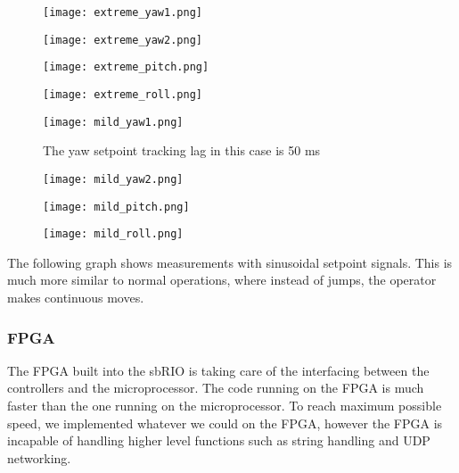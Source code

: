 \begin{figure}[h] \label{ fig7} \begin{minipage}[b]{0.50\linewidth}\centering\texttt{[image: extreme\_yaw1.png]} \caption{} \end{minipage} \begin{minipage}[b]{0.50\linewidth}\centering\texttt{[image: extreme\_yaw2.png]} \caption{} \end{minipage} \begin{minipage}[b]{0.50\linewidth}\centering\texttt{[image: extreme\_pitch.png]} \caption{} \end{minipage}\hfill \begin{minipage}[b]{0.50\linewidth}\centering\texttt{[image: extreme\_roll.png]} \caption{} \end{minipage} \end{figure}

\begin{figure}[h] \label{ fig7} \begin{minipage}[b]{0.50\linewidth}\centering\texttt{[image: mild\_yaw1.png]} \caption{The yaw setpoint tracking lag in this case is 50 ms} \end{minipage} \begin{minipage}[b]{0.50\linewidth}\centering\texttt{[image: mild\_yaw2.png]} \caption{} \end{minipage} \begin{minipage}[b]{0.50\linewidth}\centering\texttt{[image: mild\_pitch.png]} \caption{} \end{minipage}\hfill \begin{minipage}[b]{0.50\linewidth}\centering\texttt{[image: mild\_roll.png]} \caption{} \end{minipage} \end{figure}


The following graph shows measurements with sinusoidal setpoint signals. This is much more similar to normal operations, where instead of jumps, the operator makes continuous moves.



\subsubsection{FPGA}

The FPGA built into the sbRIO is taking care of the interfacing between the controllers and the microprocessor. The code running on the FPGA is much faster than the one running on the microprocessor. To reach maximum possible speed, we implemented whatever we could on the FPGA, however the FPGA is incapable of handling higher level functions such as string handling and UDP networking.


